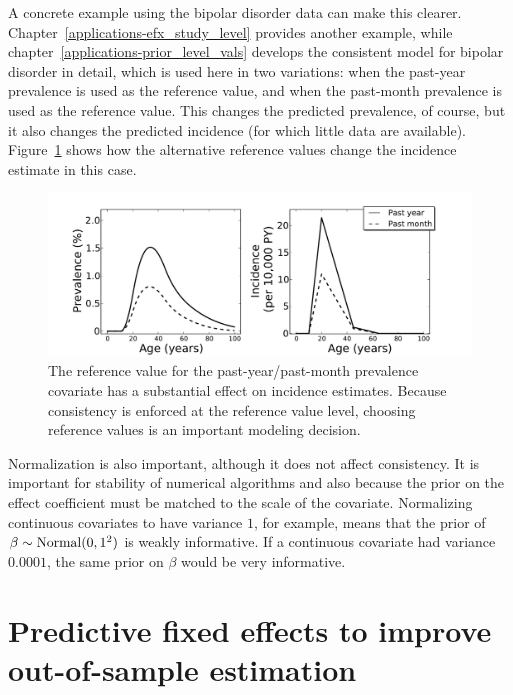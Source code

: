 A concrete example using the bipolar disorder data can make this
clearer.  Chapter~\ref{applications-efx_study_level} provides another
example, while chapter~\ref{applications-prior_level_vals} develops
the consistent model for bipolar disorder in detail, which is used
here in two variations: when the past-year prevalence is used
as the reference value, and when the past-month prevalence is
used as the reference value.  This changes the predicted prevalence, of
course, but it also changes the predicted incidence (for which little
data are available).  Figure~\ref{bipolar-ref-alts} shows how the
alternative reference values change the incidence estimate in this
case.


\begin{figure}[h]
\begin{center}
\includegraphics[width=\textwidth]{bipolar-ref-alts.pdf}
\caption{The reference value for the past-year/past-month prevalence
  covariate has a substantial effect on incidence estimates.  Because
  consistency is enforced at the reference value level, choosing reference
  values is an important modeling decision.}
\label{bipolar-ref-alts}
\end{center}
\end{figure}


Normalization is also important, although it does not affect
consistency.  It is important for stability of numerical algorithms
and also because the prior on the effect coefficient must be matched
to the scale of the covariate.  Normalizing continuous covariates to
have variance $1$, for example, means that the prior of
$\beta\sim\operatorname{Normal}(0,1^2)$ is weakly informative.  If a continuous
covariate had variance $0.0001$, the same prior on $\beta$ would be
very informative.

\section{Predictive fixed effects to improve out-of-sample estimation}

